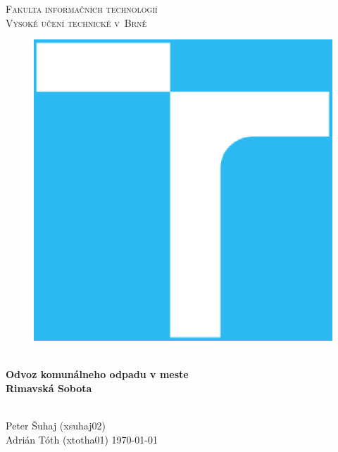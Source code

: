 \documentclass[11pt,a4paper]{article}
\begin{document}

\begin{titlepage}
    \begin{center}
        \Huge
        \textsc{
            Fakulta informačních technologií\\
            Vysoké učení technické v~Brně
        }
        \vspace{100px}
        \begin{figure}[!h]
            \centering
            \includegraphics[scale=0.3]{img/vutbr-fit-logo.eps}
        \end{figure}
        \\[25mm]
        \huge{
            \textbf{
                Odvoz komunálneho odpadu v meste\\
                Rimavská Sobota
            }
        }
        \vfill
    \end{center}
        \Large{
            \hfill\\
            Peter Šuhaj (xsuhaj02)\\
            Adrián Tóth (xtotha01) \hfill \today
        }

\end{titlepage}
\end{document}

